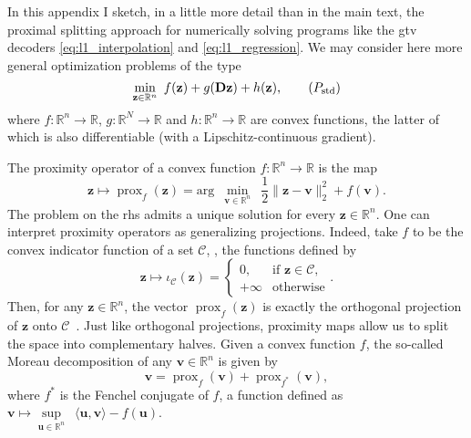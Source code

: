 In this appendix I sketch, in a little more detail than in the main text, the proximal splitting approach for numerically solving programs like the \acrshort{gtv} decoders \eqref{eq:l1_interpolation} and \eqref{eq:l1_regression}. We may consider here more general optimization problems of the type
\begin{equation}
    \underset{\mathbf{z} \in \mathbb{R}^{n}}{\min} \enspace f(\mathbf{z}) + g(\mathbf{Dz}) + h(\mathbf{z}),
    \label{eq:opt_prob_std_form} \tag{$P_{\text{std}}$}
\end{equation}
where $f: \mathbb{R}^{n} \to \mathbb{R}$, $g: \mathbb{R}^{N} \to \mathbb{R}$ and $h: \mathbb{R}^{n} \to \mathbb{R}$ are convex functions, the latter of which is also differentiable (with a Lipschitz-continuous gradient).

The proximity operator of a convex function $f : \mathbb{R}^{n} \to \mathbb{R}$ is the map
\begin{equation}
    \mathbf{z} \mapsto \operatorname{prox}_{f} \left ( \mathbf{z} \right ) = \text{arg} \enspace \underset{\mathbf{v} \in \mathbb{R}^{n}}{\min} \enspace \frac{1}{2} \|\mathbf{z} - \mathbf{v} \|_2^2 + f(\mathbf{v}).
\end{equation}
The problem on the \acrlong{rhs} admits a unique solution for every $\mathbf{z} \in \mathbb{R}^{n}$. One can interpret proximity operators as generalizing projections. Indeed, take $f$ to be the convex indicator function of a set $\mathcal{C}$, \ie, the functions defined by
\begin{equation*}
    \mathbf{z} \mapsto \iota_{\mathcal{C}}(\mathbf{z}) = \left \{
        \begin{matrix}
            0, & \text{if }\mathbf{z} \in \mathcal{C}, \\
            +\infty & \text{otherwise}
        \end{matrix}
    \right. .
\end{equation*}
Then, for any $\mathbf{z} \in \mathbb{R}^{n}$, the vector $\operatorname{prox}_{f} \left ( \mathbf{z} \right )$ is exactly the orthogonal projection of $\mathbf{z}$ onto $\mathcal{C}$~\cite[Table~2,~entry~i]{combettes2011}. Just like orthogonal projections, proximity maps allow us to split the space into complementary halves. Given a convex function $f$, the so-called Moreau decomposition of any $\mathbf{v} \in \mathbb{R}^{n}$ is given by
\begin{equation*}
    \mathbf{v} = \operatorname{prox}_{f} \left ( \mathbf{v} \right ) + \operatorname{prox}_{f^*} \left ( \mathbf{v} \right ),
\end{equation*}
where $f^*$ is the Fenchel conjugate of $f$, a function defined as $\mathbf{v} \mapsto \underset{\mathbf{u} \in \mathbb{R}^{n}}{\sup} \enspace \langle \mathbf{u}, \mathbf{v} \rangle - f(\mathbf{u})$.

